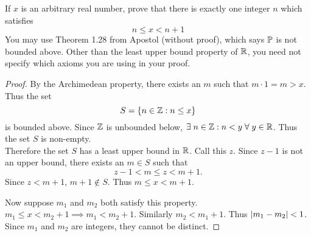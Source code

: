 \documentclass[12pt]{article}
\begin{document}
\begin{problem}
    If $x$ is an arbitrary real number, prove that there is exactly one integer $n$ which satisfies \[
        n \leq x < n + 1
    \] You may use Theorem 1.28 from Apostol (without proof), which says $\P$ is not bounded above.
    Other than the least upper bound property of $\R$, you need not specify which axioms you are using in your proof.
\end{problem}
\begin{proof}
    By the Archimedean property, there exists an $m$ such that $m \cdot 1 = m > x$. Thus the set \[
        S = \set{n \in \Z : n \leq x}
    \] is bounded above.
    Since $\Z$ is unbounded below, $\exists\; n \in \Z : n < y \;\forall\; y \in \R$. Thus the set $S$ is non-empty. \\
    Therefore the set $S$ has a least upper bound in $\R$.
    Call this $z$.
    Since $z-1$ is not an upper bound, there exists an $m \in S$ such that \[
        z - 1 < m \leq z < m + 1.
    \] Since $z < m + 1$, $m + 1 \notin S$.
    Thus $m \leq x < m + 1$.

    Now suppose $m_{1}$ and $m_{2}$ both satisfy this property.
    $m_{1} \leq x < m_{2} + 1 \implies m_{1} < m_{2} + 1$.
    Similarly $m_{2} < m_{1} + 1$.
    Thus $\abs{m_{1} - m_{2}} < 1$.
    Since $m_{1}$ and $m_{2}$ are integers, they cannot be distinct.
\end{proof}
\end{document}
